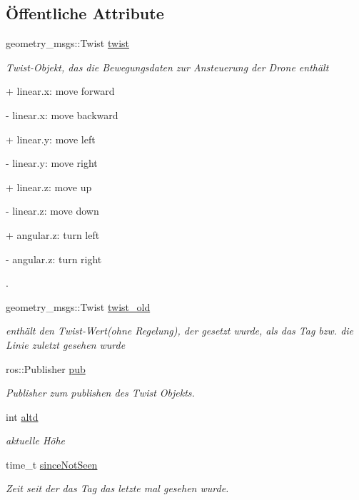 \subsection*{Öffentliche Attribute}
\begin{DoxyCompactItemize}
\item 
geometry\_\-msgs::Twist \hyperlink{class_cglobal_acdd49b2fad30faf04785664c422f5ef7}{twist}
\begin{DoxyCompactList}\small\item\em Twist-\/Objekt, das die Bewegungsdaten zur Ansteuerung der Drone enthält \par
 + linear.x: move forward \par
 -\/ linear.x: move backward \par
 + linear.y: move left \par
 -\/ linear.y: move right \par
 + linear.z: move up \par
 -\/ linear.z: move down \par
 + angular.z: turn left \par
 -\/ angular.z: turn right \par
. \end{DoxyCompactList}\item 
geometry\_\-msgs::Twist \hyperlink{class_cglobal_ae99f21083838b00781e4461e3e7accb9}{twist\_\-old}
\begin{DoxyCompactList}\small\item\em enthält den Twist-\/Wert(ohne Regelung), der gesetzt wurde, als das Tag bzw. die Linie zuletzt gesehen wurde \end{DoxyCompactList}\item 
ros::Publisher \hyperlink{class_cglobal_af3a06302b3bd19de728064359241c1a1}{pub}
\begin{DoxyCompactList}\small\item\em Publisher zum publishen des Twist Objekts. \end{DoxyCompactList}\item 
int \hyperlink{class_cglobal_a0e2d4712edf675715bd4bcc554dbcf42}{altd}
\begin{DoxyCompactList}\small\item\em aktuelle Höhe \end{DoxyCompactList}\item 
time\_\-t \hyperlink{class_cglobal_abb1e0f2a241a8d9131098cf823b45f64}{sinceNotSeen}
\begin{DoxyCompactList}\small\item\em Zeit seit der das Tag das letzte mal gesehen wurde. \end{DoxyCompactList}\item 

\end{DoxyCompactItemize}
